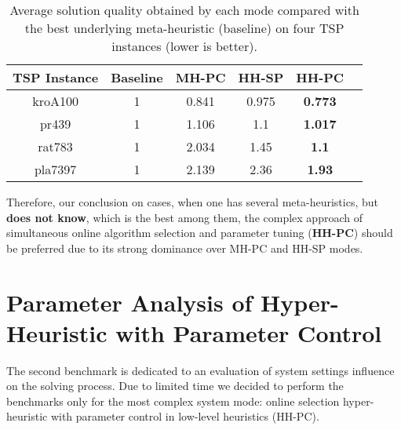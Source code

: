 \begin{table}[!htbp]
	\caption{Average solution quality obtained by each mode compared with the best underlying meta-heuristic (baseline) on four TSP instances (lower is better).}
	\label{eval:1: avg final results comparison table}
	\begin{tabular}{cccccc}
		\hline
		\rowcolor{gray!10}
		\textbf{TSP Instance} & \textbf{Baseline} & \textbf{MH-PC} & \textbf{HH-SP} & \textbf{HH-PC} \\
		\hline		
		kroA100 & 1 & 0.841 & 0.975 & \textbf{0.773} \\
		pr439 & 1 & 1.106 & 1.1 & \textbf{1.017} \\
		rat783 	& 1 & 2.034 & 1.45 & \textbf{1.1} \\
		pla7397 & 1 & 2.139 & 2.36 & \textbf{1.93} \\
		\hline
	\end{tabular}
\end{table}

Therefore, our conclusion on cases, when one has several meta-heuristics, but \textbf{does not know}, which is the best among them, the complex approach of simultaneous online algorithm selection and parameter tuning (\textbf{HH-PC}) should be preferred due to its strong dominance over MH-PC and HH-SP modes.


\section{Parameter Analysis of Hyper-Heuristic with Parameter Control}\label{eval:2}
The second benchmark is dedicated to an evaluation of system settings influence on the solving process.
Due to limited time we decided to perform the benchmarks only for the most complex system mode: online selection hyper-heuristic with parameter control in low-level heuristics (HH-PC).

